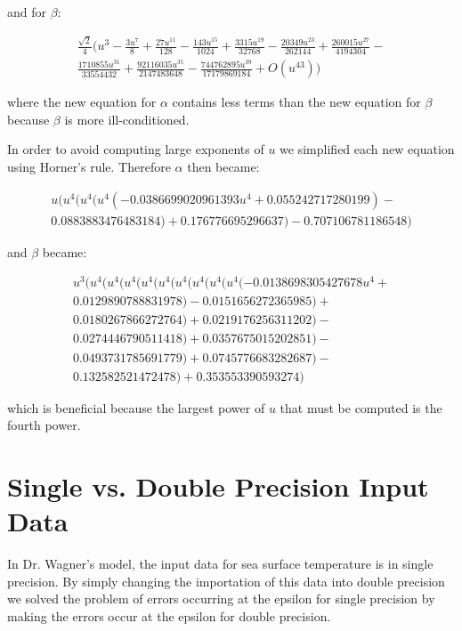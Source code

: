 \documentclass{article}
\begin{document}
and for $\beta$:

    \begin{multline}
        \frac{\sqrt{2}}{4}(u^3-\frac{3u^7}{8}+\frac{27u^{11}}{128}-
        \frac{143u^{15}}{1024}+\frac{3315u^{19}}{32768} - 
        \frac{20349u^{23}}{262144}+ \frac{260015u^{27}}{4194304} - \\ 
        \frac{1710855u^{31}}{33554432} + 
        \frac{92116035u^{35}}{2147483648} - 
        \frac{744762895u^{39}}{17179869184} + O(u^{43}))
    \end{multline}

where the new equation for $\alpha$ contains less terms than the new
equation for $\beta$ because $\beta$ is more ill-conditioned.

In order to avoid computing large exponents of $u$ we simplified each
new equation using Horner's rule. Therefore $\alpha$ then became:

    \begin{multline}
        u(u^4(u^4(u^4(-0.0386699020961393u^4 + 0.055242717280199) - \\ 
        0.0883883476483184) + 0.176776695296637) - 0.707106781186548)
    \end{multline}

and $\beta$ became:

    \begin{multline}
        u^3(u^4(u^4(u^4(u^4(u^4(u^4(u^4(u^4(u^4(-0.0138698305427678u^4 + \\
        0.0129890788831978) - 0.0151656272365985) + \\ 
        0.0180267866272764) + 0.0219176256311202) - \\
        0.0274446790511418) + 0.0357675015202851) - \\
        0.0493731785691779) + 0.0745776683282687) - \\
        0.132582521472478) + 0.353553390593274)
    \end{multline}

which is beneficial because the largest power of $u$ that must be 
computed is the fourth power.

\section{Single vs. Double Precision Input Data}
In Dr. Wagner's model, the input data for sea surface temperature is in
single precision. By simply changing the importation of this data into
double precision we solved the problem of errors occurring at the 
epsilon for single precision by making the errors occur at the epsilon
for double precision.
\end{document}

